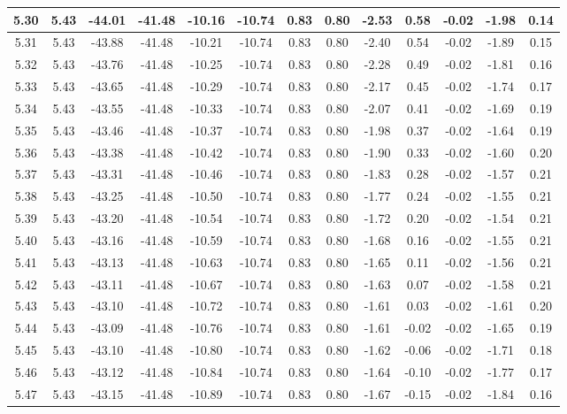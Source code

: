 \begin{table}[htbp]
\begin{adjustbox}{angle=90}
\begin{tabular}{|c|c|c|c|c|c|c|c|c|c|c|c|c|}
 5.30 & 5.43 & -44.01 & -41.48 & -10.16 & -10.74 & 0.83 & 0.80 & -2.53 & 0.58 & -0.02 & -1.98 & 0.14\\ \hline
 5.31 & 5.43 & -43.88 & -41.48 & -10.21 & -10.74 & 0.83 & 0.80 & -2.40 & 0.54 & -0.02 & -1.89 & 0.15\\ \hline
 5.32 & 5.43 & -43.76 & -41.48 & -10.25 & -10.74 & 0.83 & 0.80 & -2.28 & 0.49 & -0.02 & -1.81 & 0.16\\ \hline
 5.33 & 5.43 & -43.65 & -41.48 & -10.29 & -10.74 & 0.83 & 0.80 & -2.17 & 0.45 & -0.02 & -1.74 & 0.17\\ \hline
 5.34 & 5.43 & -43.55 & -41.48 & -10.33 & -10.74 & 0.83 & 0.80 & -2.07 & 0.41 & -0.02 & -1.69 & 0.19\\ \hline
 5.35 & 5.43 & -43.46 & -41.48 & -10.37 & -10.74 & 0.83 & 0.80 & -1.98 & 0.37 & -0.02 & -1.64 & 0.19\\ \hline
 5.36 & 5.43 & -43.38 & -41.48 & -10.42 & -10.74 & 0.83 & 0.80 & -1.90 & 0.33 & -0.02 & -1.60 & 0.20\\ \hline
 5.37 & 5.43 & -43.31 & -41.48 & -10.46 & -10.74 & 0.83 & 0.80 & -1.83 & 0.28 & -0.02 & -1.57 & 0.21\\ \hline
 5.38 & 5.43 & -43.25 & -41.48 & -10.50 & -10.74 & 0.83 & 0.80 & -1.77 & 0.24 & -0.02 & -1.55 & 0.21\\ \hline
 5.39 & 5.43 & -43.20 & -41.48 & -10.54 & -10.74 & 0.83 & 0.80 & -1.72 & 0.20 & -0.02 & -1.54 & 0.21\\ \hline
 5.40 & 5.43 & -43.16 & -41.48 & -10.59 & -10.74 & 0.83 & 0.80 & -1.68 & 0.16 & -0.02 & -1.55 & 0.21\\ \hline
 5.41 & 5.43 & -43.13 & -41.48 & -10.63 & -10.74 & 0.83 & 0.80 & -1.65 & 0.11 & -0.02 & -1.56 & 0.21\\ \hline
 5.42 & 5.43 & -43.11 & -41.48 & -10.67 & -10.74 & 0.83 & 0.80 & -1.63 & 0.07 & -0.02 & -1.58 & 0.21\\ \hline
 5.43 & 5.43 & -43.10 & -41.48 & -10.72 & -10.74 & 0.83 & 0.80 & -1.61 & 0.03 & -0.02 & -1.61 & 0.20\\ \hline
 5.44 & 5.43 & -43.09 & -41.48 & -10.76 & -10.74 & 0.83 & 0.80 & -1.61 & -0.02 & -0.02 & -1.65 & 0.19\\ \hline
 5.45 & 5.43 & -43.10 & -41.48 & -10.80 & -10.74 & 0.83 & 0.80 & -1.62 & -0.06 & -0.02 & -1.71 & 0.18\\ \hline
 5.46 & 5.43 & -43.12 & -41.48 & -10.84 & -10.74 & 0.83 & 0.80 & -1.64 & -0.10 & -0.02 & -1.77 & 0.17\\ \hline
 5.47 & 5.43 & -43.15 & -41.48 & -10.89 & -10.74 & 0.83 & 0.80 & -1.67 & -0.15 & -0.02 & -1.84 & 0.16\\ \hline

\end{tabular}
\end{adjustbox}
\end{table}
